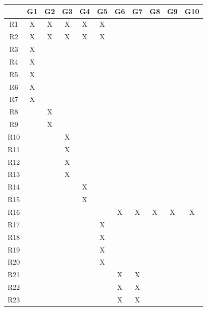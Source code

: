 \documentclass[12pt]{report}
\begin{document}
\begin{table}[h]
\centering
\begin{tabular}{|c|c|c|c|c|c|c|c|c|c|c|}
\hline
    & G1 & G2 & G3 & G4 & G5 & G6 & G7 & G8 & G9 & G10 \\ \hline
R1  & X  & X  & X  & X  & X  &    &    &    &    &     \\ \hline
R2  & X  & X  & X  & X  & X  &    &    &    &    &     \\ \hline
R3  & X  &    &    &    &    &    &    &    &    &     \\ \hline
R4  & X  &    &    &    &    &    &    &    &    &     \\ \hline
R5  & X  &    &    &    &    &    &    &    &    &     \\ \hline
R6  & X  &    &    &    &    &    &    &    &    &     \\ \hline
R7  & X  &    &    &    &    &    &    &    &    &     \\ \hline
R8  &    & X  &    &    &    &    &    &    &    &     \\ \hline
R9  &    & X  &    &    &    &    &    &    &    &     \\ \hline
R10 &    &    & X  &    &    &    &    &    &    &     \\ \hline
R11 &    &    & X  &    &    &    &    &    &    &     \\ \hline
R12 &    &    & X  &    &    &    &    &    &    &     \\ \hline
R13 &    &    & X  &    &    &    &    &    &    &     \\ \hline
R14 &    &    &    & X  &    &    &    &    &    &     \\ \hline
R15 &    &    &    & X  &    &    &    &    &    &     \\ \hline
R16 &    &    &    &    &    & X  & X  & X  & X  & X   \\ \hline
R17 &    &    &    &    & X  &    &    &    &    &     \\ \hline
R18 &    &    &    &    & X  &    &    &    &    &     \\ \hline
R19 &    &    &    &    & X  &    &    &    &    &     \\ \hline
R20 &    &    &    &    & X  &    &    &    &    &     \\ \hline
R21 &    &    &    &    &    & X  & X  &    &    &     \\ \hline
R22 &    &    &    &    &    & X  & X  &    &    &     \\ \hline
R23 &    &    &    &    &    & X  & X  &    &    &     \\ \hline

\end{tabular}
\end{table}
\end{document}
